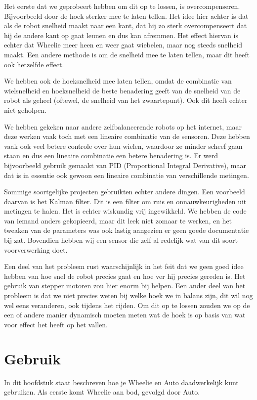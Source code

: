 \documentclass[12pt,a4paper]{article}
\begin{document}
Het eerste dat we geprobeert hebben om dit op te lossen, is overcompenseren.
Bijvoorbeeld door de hoek sterker mee te laten tellen. Het idee hier achter is
dat als de robot snelheid maakt naar een kant, dat hij zo sterk overcompenseert
dat hij de andere kant op gaat leunen en dus kan afremmen. Het effect hiervan is
echter dat Wheelie meer heen en weer gaat wiebelen, maar nog steeds snelheid
maakt. Een andere methode is om de snelheid mee te laten tellen, maar dit heeft
ook hetzelfde effect.

We hebben ook de hoeksnelheid mee laten tellen, omdat de combinatie van
wielsnelheid en hoeksnelheid de beste benadering geeft van de snelheid van de
robot als geheel (oftewel, de snelheid van het zwaartepunt). Ook dit heeft
echter niet geholpen.

We hebben gekeken naar andere zelfbalancerende robots op het internet, maar deze
werken vaak toch met een lineaire combinatie van de sensoren. Deze hebben vaak
ook veel betere controle over hun wielen, waardoor ze minder scheef gaan staan
en dus een lineaire combinatie een betere benadering is. Er werd bijvoorbeeld
gebruik gemaakt van PID (Proportional Integral Derivative), maar dat is in
essentie ook gewoon een lineaire combinatie van verschillende metingen.

Sommige soortgelijke projecten gebruikten echter andere dingen. Een voorbeeld
daarvan is het Kalman filter. Dit is een filter om ruis en onnauwkeurigheden uit
metingen te halen. Het is echter wiskundig vrij ingewikkeld. We hebben de code
van iemand anders gekopieerd, maar dit leek niet zomaar te werken, en het
tweaken van de parameters was ook lastig aangezien er geen goede documentatie
bij zat. Bovendien hebben wij een sensor die zelf al redelijk wat van dit soort
voorverwerking doet.

Een deel van het probleem rust waarschijnlijk in het feit dat we geen goed idee
hebben van hoe snel de robot precies gaat en hoe ver hij precies gereden is. Het
gebruik van stepper motoren zou hier enorm bij helpen. Een ander deel van het
probleem is dat we niet precies weten bij welke hoek we in balans zijn, dit wil
nog wel eens veranderen, ook tijdens het rijden. Om dit op te lossen zouden we
op de een of andere manier dynamisch moeten meten wat de hoek is op basis van
wat voor effect het heeft op het vallen.

\section{Gebruik}
In dit hoofdstuk staat beschreven hoe je Wheelie en Auto daadwerkelijk kunt gebruiken. Als eerste komt Wheelie aan bod, gevolgd door Auto.
\end{document}
